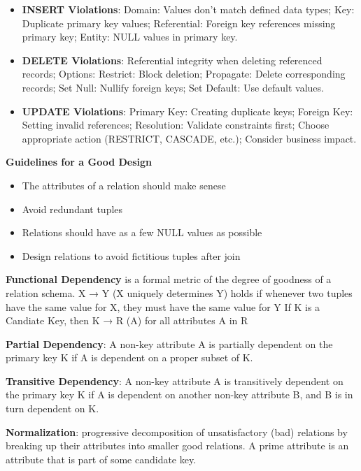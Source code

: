\documentclass{article}
\begin{document}
\begin{itemize}
    \item \textbf{INSERT Violations}: Domain: Values don't match defined data types; Key: Duplicate primary key values; Referential: Foreign key references missing primary key; Entity: NULL values in primary key.
    \item \textbf{DELETE Violations}: Referential integrity when deleting referenced records; Options: Restrict: Block deletion; Propagate: Delete corresponding records; Set Null: Nullify foreign keys; Set Default: Use default values.
    \item \textbf{UPDATE Violations}: Primary Key: Creating duplicate keys; Foreign Key: Setting invalid references; Resolution: Validate constraints first; Choose appropriate action (RESTRICT, CASCADE, etc.); Consider business impact.
\end{itemize}

\noindent \textbf{Guidelines for a Good Design}

\begin{itemize}
    \item The attributes of a relation should make senese
    \item Avoid redundant tuples
    \item Relations should have as a few NULL values as possible
    \item Design relations to avoid fictitious tuples after join
\end{itemize}

\noindent \textbf{Functional Dependency} is a formal metric of the degree of goodness of a relation schema.
X → Y (X uniquely determines Y) holds if whenever two tuples have the same value for X, they must have the same value for Y
If K is a Candiate Key, then K → R (A) for all attributes A in R

\noindent \textbf{Partial Dependency}: A non-key attribute A is partially dependent on the primary key K if A
is dependent on a proper subset of K.

\noindent \textbf{Transitive Dependency}: A non-key attribute A is transitively dependent on the primary key K
if A is dependent on another non-key attribute B, and B is in turn dependent on K.

\noindent \textbf{Normalization}: progressive decomposition of unsatisfactory (bad) relations by breaking
up their attributes into smaller good relations. A prime attribute is an attribute that is part of some candidate key.
\end{document}

